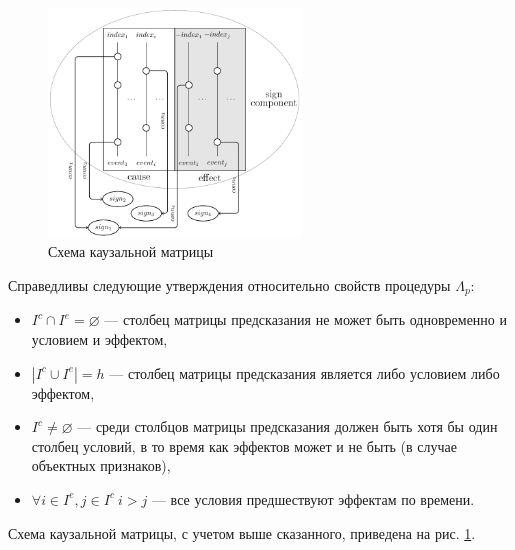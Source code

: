 \documentclass[12pt]{scrartcl}
\begin{document}
	\begin{figure}[H]
		\centering
		\includegraphics[width=0.6\textwidth]{automata/caus_matr}
		\caption{Схема каузальной матрицы}	
		\label{fig:caus_matr}	
	\end{figure}
	
	Справедливы следующие утверждения относительно свойств процедуры $\Lambda_p$:
	\begin{itemize}
		\item $I^c\cap I^e=\varnothing$ --- столбец матрицы предсказания не может быть одновременно и условием и эффектом,
		\item $|I^c\cup I^e|=h$ --- столбец матрицы предсказания является либо условием либо эффектом,
		\item $I^c\not = \varnothing$ --- среди столбцов матрицы предсказания должен быть хотя бы один столбец условий, в то время как эффектов может и не быть (в случае объектных признаков),
		\item $\forall i\in I^e, j\in I^c\ i>j$ --- все условия предшествуют эффектам по времени.
	\end{itemize}
	
	Схема каузальной матрицы, с учетом выше сказанного, приведена на рис. \ref{fig:caus_matr}.
	
\end{document}
